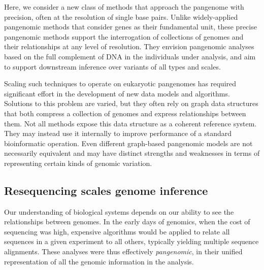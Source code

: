 Here, we consider a new class of methods that approach the pangenome with precision, often at the resolution of single base pairs.
Unlike widely-applied pangenomic methods that consider genes as their fundamental unit, these precise pangenomic methods support the interrogation of collections of genomes and their relationships at any level of resolution.
They envision pangenomic analyses based on the full complement of DNA in the individuals under analysis, and aim to support downstream inference over variants of all types and scales.

Scaling such techniques to operate on eukaryotic pangenomes has required significant effort in the development of new data models and algorithms.
Solutions to this problem are varied, but they often rely on graph data structures that both compress a collection of genomes and express relationships between them.
Not all methods expose this data structure as a coherent reference system.
They may instead use it internally to improve performance of a standard bioinformatic operation.
Even different graph-based pangenomic models are not necessarily equivalent and may have distinct strengths and weaknesses in terms of representing certain kinds of genomic variation.


\subsection{Resequencing scales genome inference}

Our understanding of biological systems depends on our ability to see the relationships between genomes.
In the early days of genomics, when the cost of sequencing was high, expensive algorithms would be applied to relate all sequences in a given experiment to all others, typically yielding multiple sequence alignments.
These analyses were thus effectively \emph{pangenomic}, in their unified representation of all the genomic information in the analysis.

